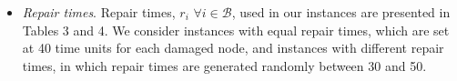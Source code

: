 \documentclass[11pt]{article}
\begin{document}
\begin{itemize}


\item \textit{Repair times}. Repair times, $r_i$ $\forall i \in \mathcal{B}$, used in our instances are presented in Tables 3 and 4. We consider instances with equal repair times, which are set at 40 time units for each damaged node, and instances with different repair times, in which repair times are generated randomly between 30 and 50.
\end{itemize}





\end{document}
